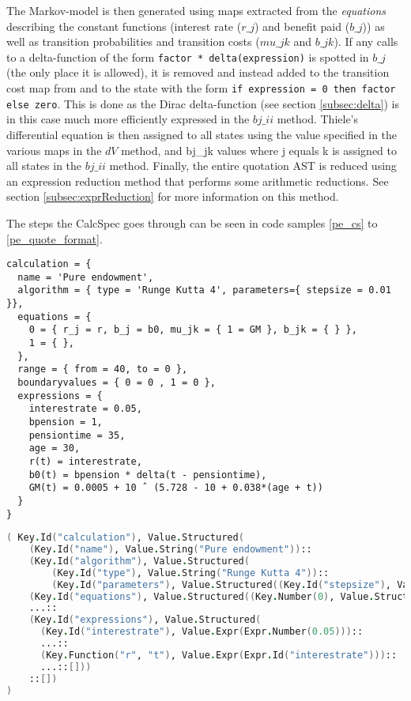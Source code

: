 The Markov-model is then generated using maps extracted from the \emph{equations} describing the constant functions (interest rate ($r\_j$) and benefit paid ($b\_j$)) as well as transition probabilities and transition costs ($mu\_jk$ and $b\_jk$).
If any calls to a delta-function of the form \lstinline$factor * delta(expression)$ is spotted in $b\_j$ (the only place it is allowed), it is removed and instead added to the transition cost map from and to the state with the form \lstinline$if expression = 0 then factor else zero$.
This is done as the Dirac delta-function (see section \ref{subsec:delta}) is in this case much more efficiently expressed in the $bj\_ii$ method.
Thiele's differential equation is then assigned to all states using the value specified in the various maps in the $dV$ method, and bj\_jk values where j equals k is assigned to all states in the $bj\_ii$ method.
Finally, the entire quotation AST is reduced using an expression reduction method that performs some arithmetic reductions.
See section \ref{subsec:exprReduction} for more information on this method.

The steps the CalcSpec goes through can be seen in code samples \ref{pe_cs} to \ref{pe_quote_format}.
\clearpage
\begin{lstlisting}[language=calcspec, caption=Pure endowment in CalcSpec, label=pe_cs]
calculation = {
  name = 'Pure endowment',
  algorithm = { type = 'Runge Kutta 4', parameters={ stepsize = 0.01 }},
  equations = {
    0 = { r_j = r, b_j = b0, mu_jk = { 1 = GM }, b_jk = { } },
    1 = { },
  },
  range = { from = 40, to = 0 },
  boundaryvalues = { 0 = 0 , 1 = 0 },
  expressions = {
    interestrate = 0.05,
    bpension = 1,
    pensiontime = 35,
    age = 30,
    r(t) = interestrate,
    b0(t) = bpension * delta(t - pensiontime),
    GM(t) = 0.0005 + 10 ˆ (5.728 - 10 + 0.038*(age + t))
  }
}
\end{lstlisting}

\begin{lstlisting}[language=fsharp, caption=Abstract Syntax Tree for the Pure endowment CalcSpec, label=pe_ast]
( Key.Id("calculation"), Value.Structured(
    (Key.Id("name"), Value.String("Pure endowment"))::
    (Key.Id("algorithm"), Value.Structured(
        (Key.Id("type"), Value.String("Runge Kutta 4"))::
        (Key.Id("parameters"), Value.Structured((Key.Id("stepsize"), Value.Expr(Expr.Number(0.01)))::[])))::[])::
    (Key.Id("equations"), Value.Structured((Key.Number(0), Value.Structured(...:[]))::[]))::
    ...::
    (Key.Id("expressions"), Value.Structured(
      (Key.Id("interestrate"), Value.Expr(Expr.Number(0.05)))::
      ...::
      (Key.Function("r", "t"), Value.Expr(Expr.Id("interestrate")))::
      ...::[]))
    ::[])
)
\end{lstlisting}


